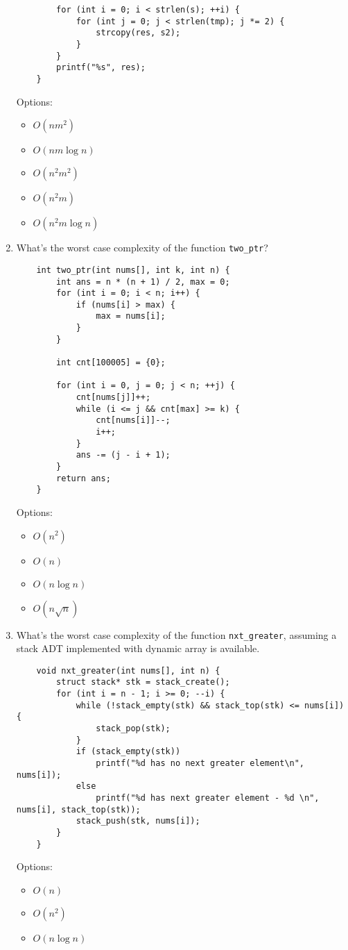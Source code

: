 \documentclass{article}
\begin{document}
\begin{enumerate}
\begin{lstlisting}
        for (int i = 0; i < strlen(s); ++i) {
            for (int j = 0; j < strlen(tmp); j *= 2) {
                strcopy(res, s2);
            }
        }
        printf("%s", res);
    }
    \end{lstlisting}
    Options:
    \begin{itemize}
        \item \( O(nm^2) \)
        \item \( O(nm \log n) \)
        \item \( O(n^2m^2) \)
        \item \( O(n^2m) \) \hl{\checkmark}
        \item \( O(n^2m \log n) \)
    \end{itemize}

    \item What’s the worst case complexity of the function \texttt{two\_ptr}?
    \begin{lstlisting}
    int two_ptr(int nums[], int k, int n) {
        int ans = n * (n + 1) / 2, max = 0;
        for (int i = 0; i < n; i++) {
            if (nums[i] > max) {
                max = nums[i];
            }
        }

        int cnt[100005] = {0};

        for (int i = 0, j = 0; j < n; ++j) {
            cnt[nums[j]]++;
            while (i <= j && cnt[max] >= k) {
                cnt[nums[i]]--;
                i++;
            }
            ans -= (j - i + 1);
        }
        return ans;
    }
    \end{lstlisting}
    Options:
    \begin{itemize}
        \item \( O(n^2) \)
        \item \( O(n) \) \hl{\checkmark}
        \item \( O(n \log n) \)
        \item \( O(n \sqrt{n}) \)
    \end{itemize}

    \newpage
    \item What’s the worst case complexity of the function \texttt{nxt\_greater}, assuming a stack ADT implemented with dynamic array is available.
    \begin{lstlisting}
    void nxt_greater(int nums[], int n) {
        struct stack* stk = stack_create();
        for (int i = n - 1; i >= 0; --i) {
            while (!stack_empty(stk) && stack_top(stk) <= nums[i]) {
                stack_pop(stk);
            }
            if (stack_empty(stk))
                printf("%d has no next greater element\n", nums[i]);
            else 
                printf("%d has next greater element - %d \n", nums[i], stack_top(stk));
            stack_push(stk, nums[i]);
        }
    }
    \end{lstlisting}
    Options:
    \begin{itemize}
        \item \( O(n) \) \hl{\checkmark}
        \item \( O(n^2) \)
        \item \( O(n \log n) \)
    \end{itemize}


\end{enumerate}
\end{document}
